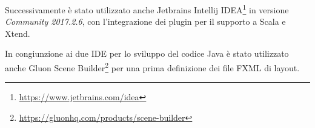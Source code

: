                 Successivamente è stato utilizzato anche Jetbrains Intellij IDEA\footnote{\url{https://www.jetbrains.com/idea}} in versione \textit{Community 2017.2.6}, con l'integrazione dei plugin per il supporto a Scala e Xtend.

                In congiunzione ai due IDE per lo sviluppo del codice Java è stato utilizzato anche Gluon Scene Builder\footnote{\url{https://gluonhq.com/products/scene-builder}} per una prima definizione dei file FXML di layout.
